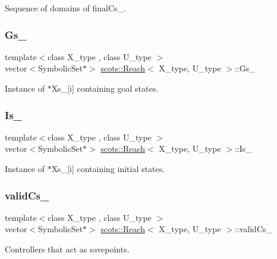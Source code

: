 Sequence of domains of final\+Cs\+\_\+. \mbox{\label{classscots_1_1Reach_af3fd5ddf192d97ec5dc650ad57e6c485}} 
\subsubsection{\texorpdfstring{Gs\+\_\+}{Gs\_}}
{\footnotesize\ttfamily template$<$class X\+\_\+type , class U\+\_\+type $>$ \\
vector$<$Symbolic\+Set$\ast$$>$ \hyperlink{classscots_1_1Reach}{scots\+::\+Reach}$<$ X\+\_\+type, U\+\_\+type $>$\+::Gs\+\_\+}

Instance of $\ast$\+Xs\+\_\+\mbox{[}i\mbox{]} containing goal states. \mbox{\label{classscots_1_1Reach_a3366767e4a2edbb8c683e0a74a709b10}} 
\subsubsection{\texorpdfstring{Is\+\_\+}{Is\_}}
{\footnotesize\ttfamily template$<$class X\+\_\+type , class U\+\_\+type $>$ \\
vector$<$Symbolic\+Set$\ast$$>$ \hyperlink{classscots_1_1Reach}{scots\+::\+Reach}$<$ X\+\_\+type, U\+\_\+type $>$\+::Is\+\_\+}

Instance of $\ast$\+Xs\+\_\+\mbox{[}i\mbox{]} containing initial states. \mbox{\label{classscots_1_1Reach_ade8c2425a8ff0cc7d7ed017412b6aa29}} 
\subsubsection{\texorpdfstring{valid\+Cs\+\_\+}{validCs\_}}
{\footnotesize\ttfamily template$<$class X\+\_\+type , class U\+\_\+type $>$ \\
vector$<$Symbolic\+Set$\ast$$>$ \hyperlink{classscots_1_1Reach}{scots\+::\+Reach}$<$ X\+\_\+type, U\+\_\+type $>$\+::valid\+Cs\+\_\+}

Controllers that act as savepoints. \mbox{\label{classscots_1_1Reach_a2f484ac1e7bd5a451b409c373149369c}} 
